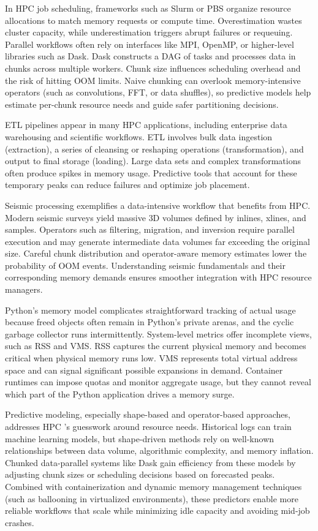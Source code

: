 In \ac{HPC} job scheduling, frameworks such as Slurm or \ac{PBS} organize resource allocations to match memory requests or compute time.
Overestimation wastes cluster capacity, while underestimation triggers abrupt failures or requeuing.
Parallel workflows often rely on interfaces like \ac{MPI}, \ac{OpenMP}, or higher-level libraries such as Dask.
Dask constructs a \ac{DAG} of tasks and processes data in chunks across multiple workers.
Chunk size influences scheduling overhead and the risk of hitting \ac{OOM} limits.
Naive chunking can overlook memory-intensive operators (such as convolutions, \ac{FFT}, or data shuffles), so predictive models help estimate per-chunk resource needs and guide safer partitioning decisions.

\ac{ETL} pipelines appear in many \ac{HPC} applications, including enterprise data warehousing and scientific workflows.
\ac{ETL} involves bulk data ingestion (extraction), a series of cleansing or reshaping operations (transformation), and output to final storage (loading).
Large data sets and complex transformations often produce spikes in memory usage.
Predictive tools that account for these temporary peaks can reduce failures and optimize job placement.

Seismic processing exemplifies a data-intensive workflow that benefits from \ac{HPC}.
Modern seismic surveys yield massive \ac{3D} volumes defined by inlines, xlines, and samples.
Operators such as filtering, migration, and inversion require parallel execution and may generate intermediate data volumes far exceeding the original size.
Careful chunk distribution and operator-aware memory estimates lower the probability of \ac{OOM} events.
Understanding seismic fundamentals and their corresponding memory demands ensures smoother integration with \ac{HPC} resource managers.

Python's memory model complicates straightforward tracking of actual usage because freed objects often remain in Python's private arenas, and the cyclic garbage collector runs intermittently.
System-level metrics offer incomplete views, such as \ac{RSS} and \ac{VMS}. \ac{RSS} captures the current physical memory and becomes critical when physical memory runs low.
\ac{VMS} represents total virtual address space and can signal significant possible expansions in demand.
Container runtimes can impose quotas and monitor aggregate usage, but they cannot reveal which part of the Python application drives a memory surge.

Predictive modeling, especially shape-based and operator-based approaches, addresses \ac{HPC} 's guesswork around resource needs.
Historical logs can train machine learning models, but shape-driven methods rely on well-known relationships between data volume, algorithmic complexity, and memory inflation.
Chunked data-parallel systems like Dask gain efficiency from these models by adjusting chunk sizes or scheduling decisions based on forecasted peaks.
Combined with containerization and dynamic memory management techniques (such as ballooning in virtualized environments), these predictors enable more reliable workflows that scale while minimizing idle capacity and avoiding mid-job crashes.


